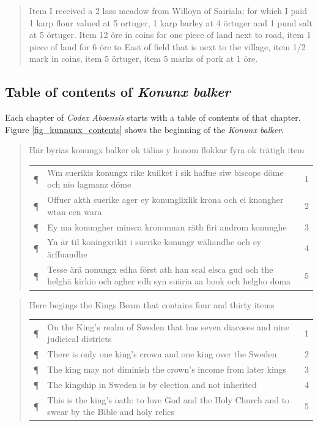 \documentclass[a4paper]{article}
\begin{document}
\begin{quote}
  Item I received a 2 lass meadow from Willoyn of Sairiala; for which I
  paid 1 karp flour valued at 5 ortuger, 1 karp barley at 4 örtuger
  and 1 pund salt at 5 örtuger. Item 12 öre in coins for one piece of
  land next to road, item 1 piece of land for 6 öre to East of field
  that is next to the village, item 1/2 mark in coins, item 5 örtuger,
  item 5 marks of pork at 1 öre.
\end{quote}


\subsection{Table of contents of \emph{Konunx balker}}

Each chapter of \emph{Codex Aboensis} starts with a table of contents
of that chapter. Figure \ref{fig_kunnunx_contents} shows the beginning
of the \emph{Konunx balker}.

\begin{quote}
  Här byrias konungx balker ok tälias y honom flokkar fyra ok trätigh
  item \\

  \begin{tabular}{lp{10cm}l}
    ¶ & Wm suerikis konungx rike kuilket i sik haffue siw biscops döme
    och nio lagmanz döme & 1 \\
    ¶ & Offuer akth suerike ager ey konunglixlik krona och ei knongher
    wtan een wara & 2 \\
    ¶ & Ey ma konungher minsca kronunnan räth firi androm konunghe & 3
    \\
    ¶ & Yn är til koningxrikit i suerike konungr wäliandhe och ey
    ärffuandhe & 4 \\
    ¶ & Tesse ärä nonungx edha först ath han scal elsca gud och the
    helghä kirkio och agher edh syn suäria aa book och helgho doma & 5 \\ 
  \end{tabular}
\end{quote}



\begin{quote}
  Here begings the Kings Beam that contains four and thirty items  \\

  \begin{tabular}{lp{10cm}l}
    ¶ & On the King's realm of Sweden that has seven diacoses and nine
    judicical districts & 1 \\
    ¶ & There is only one king's crown and one king over the Sweden & 2\\
    ¶ & The king may not diminish the crown's income from later
    kings & 3 \\
    ¶ & The kingship in Sweden is by election and not inherited  & 4 \\
    ¶ & This is the king's oath: to love God and the Holy Church and
    to swear by the Bible and holy relics & 5 \\ 
  \end{tabular}

\end{quote}
\end{document}
